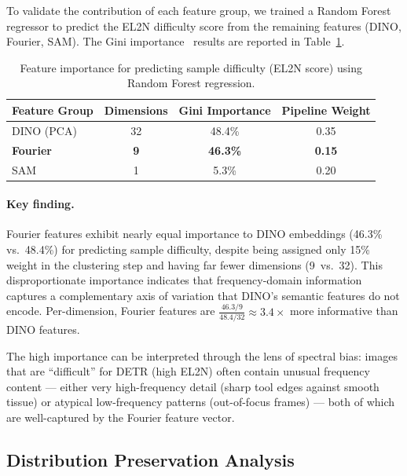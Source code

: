 To validate the contribution of each feature group, we trained a Random Forest
regressor to predict the EL2N difficulty score from the remaining features
(DINO, Fourier, SAM).  The Gini importance~\cite{breiman2001random} results
are reported in Table~\ref{tab:feature_importance}.

\begin{table}[h]
\centering
\caption{Feature importance for predicting sample difficulty (EL2N score)
         using Random Forest regression.}
\label{tab:feature_importance}
\begin{tabular}{lccc}
\toprule
\textbf{Feature Group} & \textbf{Dimensions} &
    \textbf{Gini Importance} & \textbf{Pipeline Weight} \\
\midrule
DINO (PCA)  & 32 & 48.4\% & 0.35 \\
\textbf{Fourier} & \textbf{9} & \textbf{46.3\%} & \textbf{0.15} \\
SAM         &  1 &  5.3\% & 0.20 \\
\bottomrule
\end{tabular}
\end{table}

\paragraph{Key finding.}
Fourier features exhibit nearly equal importance to DINO embeddings
(46.3\% vs.\ 48.4\%) for predicting sample difficulty, despite being assigned
only 15\% weight in the clustering step and having far fewer dimensions
(9~vs.~32).  This disproportionate importance indicates that frequency-domain
information captures a complementary axis of variation that DINO's semantic
features do not encode.  Per-dimension, Fourier features are
$\frac{46.3/9}{48.4/32} \approx 3.4\times$ more informative than DINO
features.

The high importance can be interpreted through the lens of spectral bias:
images that are ``difficult'' for DETR (high EL2N) often contain unusual
frequency content --- either very high-frequency detail (sharp tool edges
against smooth tissue) or atypical low-frequency patterns (out-of-focus
frames) --- both of which are well-captured by the Fourier feature vector.


\subsection{Distribution Preservation Analysis}
\label{sec:distribution}

